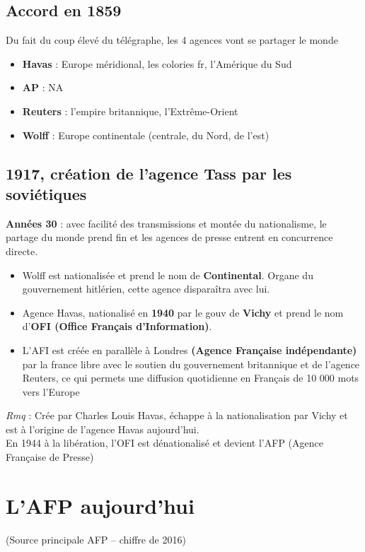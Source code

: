 \documentclass[a4paper,11pt]{report}
\begin{document}
\section{Accord en 1859}
Du fait du coup élevé du télégraphe, les 4 agences vont se partager le monde \\
\begin{itemize}
    \item \textbf{Havas} : Europe méridional, les colories fr, l’Amérique du Sud 
    \item \textbf{AP} : NA
    \item \textbf{Reuters} : l’empire britannique, l’Extrême-Orient
    \item \textbf{Wolff} : Europe continentale (centrale, du Nord, de l’est)
\end{itemize}

\section{1917, création de l’agence Tass par les soviétiques}
\textbf{Années 30} : avec facilité des transmissions et montée du nationalisme, le partage du monde prend fin et les agences de presse entrent en concurrence directe.
\begin{itemize}
    \item Wolff est nationalisée et prend le nom de \textbf{Continental}. Organe du gouvernement hitlérien, cette agence disparaîtra avec lui.
    \item Agence Havas, nationalisé en \textbf{1940} par le gouv de \textbf{Vichy} et prend le nom d’\textbf{OFI (Office Français d’Information)}. 
    \item L'AFI est créée en parallèle à Londres \textbf{(Agence Française indépendante)} par la france libre avec le soutien du gouvernement britannique et de l'agence Reuters, 
    ce qui permets une diffusion quotidienne en Français de 10 000 mots vers l'Europe
\end{itemize}

\textit{Rmq} : Crée par Charles Louis Havas, échappe à la nationalisation par Vichy et est à l’origine de l’agence Havas aujourd’hui. \\
En 1944 à la libération, l’OFI est dénationalisé et devient l’AFP (Agence Française de Presse)

\chapter{L’AFP aujourd’hui}
(Source principale AFP – chiffre de 2016)
\end{document}
